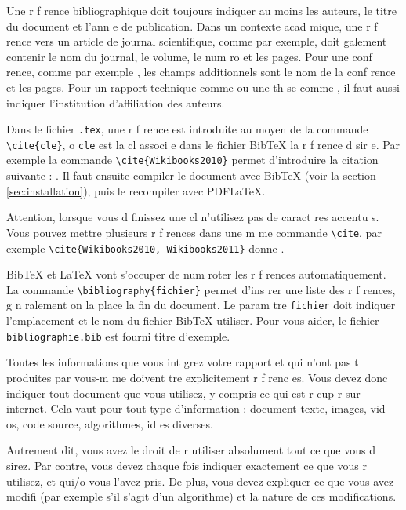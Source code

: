 \documentclass{article}
\begin{document}
Une r f rence bibliographique doit toujours indiquer au moins les auteurs, le titre du document et l'ann e de publication. Dans un contexte acad mique, une r f rence vers un article de journal scientifique, comme \cite{Fortunato2010} par exemple, doit  galement contenir le nom du journal, le volume, le num ro et les pages. Pour une conf rence, comme par exemple \cite{Wei1989}, les champs additionnels sont le nom de la conf rence et les pages. Pour un rapport technique comme \cite{Rosvall2009a} ou une th se comme \cite{Gerbaud2010}, il faut aussi indiquer l'institution d'affiliation des auteurs.

Dans le fichier \texttt{.tex}, une r f rence est introduite au moyen de la commande \texttt{\textbackslash{}cite\{cle\}}, o  \texttt{cle} est la cl  associ e dans le fichier BibTeX   la r f rence d sir e. Par exemple la commande \texttt{\textbackslash{}cite\{Wikibooks2010\}} permet d'introduire la citation suivante : \cite{Wikibooks2010}. Il faut ensuite compiler le document avec BibTeX (voir la section \ref{sec:installation}), puis le recompiler avec PDFLaTeX.
	
Attention, lorsque vous d finissez une cl  n'utilisez pas de caract res accentu s. Vous pouvez mettre plusieurs r f rences dans une m me commande \texttt{\textbackslash{}cite}, par exemple \texttt{\textbackslash{}cite\{Wikibooks2010, Wikibooks2011\}} donne \cite{Wikibooks2010, Wikibooks2011}.
	
BibTeX et \LaTeX{} vont s'occuper de num roter les r f rences automatiquement. La commande \texttt{\textbackslash{}bibliography\{fichier\}} permet d'ins rer une liste des r f rences, g n ralement on la place   la fin du document. Le param tre \texttt{fichier} doit indiquer l'emplacement et le nom du fichier BibTeX   utiliser. Pour vous aider, le fichier \texttt{bibliographie.bib} est fourni   titre d'exemple.
	
Toutes les informations que vous int grez   votre rapport et qui n'ont pas  t  produites par vous-m me doivent  tre explicitement r f renc es. Vous devez donc indiquer tout document que vous utilisez, y compris ce qui est r cup r  sur internet. Cela vaut pour tout type d'information : document texte, images, vid os, code source, algorithmes, id es diverses.

Autrement dit, vous avez le droit de r utiliser absolument tout ce que vous d sirez. Par contre, vous devez   chaque fois indiquer exactement ce que vous r utilisez, et   qui/o  vous l'avez pris. De plus, vous devez expliquer ce que vous avez modifi  (par exemple s'il s'agit d'un algorithme) et la nature de ces modifications.
\end{document}
